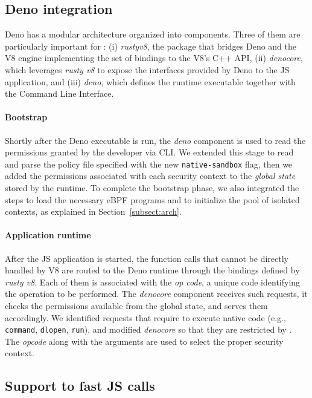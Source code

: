 \subsection{Deno integration}
\label{subsect:deno-integration}

Deno has a modular architecture organized into components. Three of
them are particularly important for \pap: (i) {\em
  rusty\textunderscore v8}, the package that bridges Deno and the V8
engine implementing the set of bindings to the V8's C++ API, (ii) {\em
  deno\textunderscore core}, which leverages {\em rusty\textunderscore
  v8} to expose the interfaces provided by Deno to the JS application,
and (iii) {\em deno}, which defines the runtime executable together
with the Command Line Interface.

\paragraph{Bootstrap}
%
Shortly after the Deno executable is run, the {\em deno} component is
used to read the permissions granted by the developer via CLI. We
extended this stage to read and parse the policy file specified with
the new {\tt native-sandbox} flag, then we added the permissions
associated with each security context to the {\em global state} stored
by the runtime. To complete the bootstrap phase, we also integrated
the steps to load the necessary eBPF programs and to initialize the
pool of isolated contexts, as explained in Section~\ref{subsect:arch}.

\paragraph{Application runtime}
%
After the JS application is started, the function
calls that cannot be directly handled by V8 are routed to the Deno
runtime through the bindings defined by {\em rusty\textunderscore
  v8}. Each of them is associated with the {\em op\textunderscore
  code}, a unique code identifying the operation to be
performed. The {\em deno\textunderscore core} component receives such
requests, it checks the permissions available from the global state,
and serves them accordingly. We identified requests that
require to execute native code (e.g., {\tt command}, {\tt dlopen},
{\tt run}), and modified {\em deno\textunderscore core} so that they
are restricted by \pap. The {\em op\textunderscore code} along
with the arguments are used to select the proper security context.


\subsection{Support to fast JS calls}
\label{subsect:fast-api}


